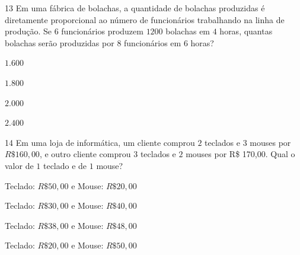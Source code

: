 \num{13} Em uma fábrica de bolachas, a quantidade de bolachas produzidas é
diretamente proporcional ao número de funcionários trabalhando na linha
de produção. Se $6$ funcionários produzem $1200$ bolachas em $4$ horas,
quantas bolachas serão produzidas por $8$ funcionários em $6$ horas?

\begin{escolha}
\item $1.600$ 
\item $1.800$ 
\item $2.000$ 
\item $2.400$
\end{escolha}



\num{14} Em uma loja de informática, um cliente comprou $2$ teclados e $3$ mouses
por $R\$160,00$, e outro cliente comprou $3$ teclados e $2$ mouses por R\$
170,00. Qual o valor de $1$ teclado e de $1$ mouse?

\begin{escolha}
\item Teclado: $R\$50,00$ e Mouse: $R\$20,00$
\item Teclado: $R\$30,00$ e Mouse: $R\$40,00$
\item Teclado: $R\$38,00$ e Mouse: $R\$48,00$
\item Teclado: $R\$20,00$ e Mouse: $R\$50,00$
\end{escolha}


